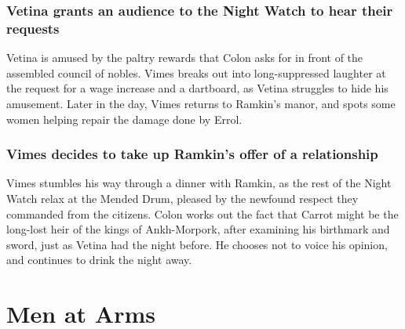 \subsubsection{\Gls{Vetina} grants an audience to the Night Watch to hear their requests}
\Gls{Vetina} is amused by the paltry rewards that \Gls{Colon} asks for in front of the assembled
council of nobles. \Gls{Vimes} breaks out into long-suppressed laughter at the request for a wage
increase and a dartboard, as \Gls{Vetina} struggles to hide his amusement. Later in the day,
\Gls{Vimes} returns to \Gls{Ramkin}'s manor, and spots some women helping repair the damage done
by \Gls{Errol}.

\subsubsection{\Gls{Vimes} decides to take up \Gls{Ramkin}'s offer of a relationship}
\Gls{Vimes} stumbles his way through a dinner with \Gls{Ramkin}, as the rest of the Night Watch
relax at the Mended Drum, pleased by the newfound respect they commanded from the citizens.
\Gls{Colon} works out the fact that \Gls{Carrot} might be the long-lost heir of the kings of
Ankh-Morpork, after examining his birthmark and sword, just as \Gls{Vetina} had the night before. He
chooses not to voice his opinion, and continues to drink the night away.


\section{Men at Arms}


\subsection{}
\subsubsection{}

